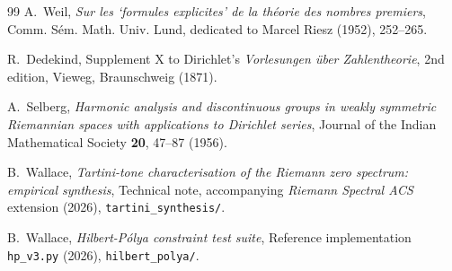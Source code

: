 \documentclass[11pt,a4paper]{article}
\theoremstyle{plain}
\theoremstyle{definition}
\theoremstyle{remark}
\begin{document}
\begin{thebibliography}{99}
A.~Weil,
\textit{Sur les `formules explicites' de la th\'{e}orie des nombres premiers},
Comm. S\'{e}m. Math. Univ. Lund, dedicated to Marcel Riesz (1952), 252--265.

R.~Dedekind,
Supplement X to Dirichlet's \textit{Vorlesungen \"{u}ber Zahlentheorie},
2nd edition, Vieweg, Braunschweig (1871).

A.~Selberg,
\textit{Harmonic analysis and discontinuous groups in weakly symmetric
Riemannian spaces with applications to Dirichlet series},
Journal of the Indian Mathematical Society \textbf{20}, 47--87 (1956).

B.~Wallace,
\textit{Tartini-tone characterisation of the Riemann zero spectrum:
empirical synthesis},
Technical note, accompanying \textit{Riemann Spectral ACS} extension (2026),
\texttt{tartini\_synthesis/}.

B.~Wallace,
\textit{Hilbert-P\'{o}lya constraint test suite},
Reference implementation \texttt{hp\_v3.py} (2026),
\texttt{hilbert\_polya/}.

\end{thebibliography}
\end{document}
